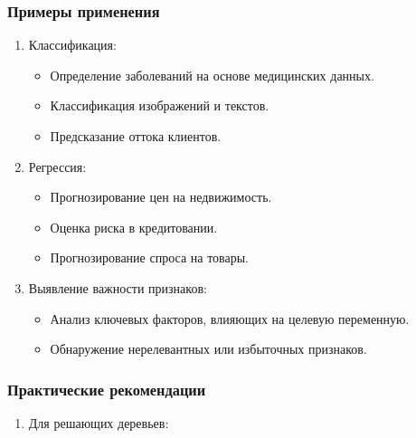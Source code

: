 \begin{enumerate}
{\subsubsection*{Примеры
применения}\label{ux43fux440ux438ux43cux435ux440ux44b-ux43fux440ux438ux43cux435ux43dux435ux43dux438ux44f-1}}

\begin{enumerate}
\def\labelenumi{\arabic{enumi}.}
\tightlist
\item
  Классификация:

  \begin{itemize}
  \tightlist
  \item
    Определение заболеваний на основе медицинских данных.
  \item
    Классификация изображений и текстов.
  \item
    Предсказание оттока клиентов.
  \end{itemize}
\item
  Регрессия:

  \begin{itemize}
  \tightlist
  \item
    Прогнозирование цен на недвижимость.
  \item
    Оценка риска в кредитовании.
  \item
    Прогнозирование спроса на товары.
  \end{itemize}
\item
  Выявление важности признаков:

  \begin{itemize}
  \tightlist
  \item
    Анализ ключевых факторов, влияющих на целевую переменную.
  \item
    Обнаружение нерелевантных или избыточных признаков.
  \end{itemize}
\end{enumerate}

\hypertarget{ux43fux440ux430ux43aux442ux438ux447ux435ux441ux43aux438ux435-ux440ux435ux43aux43eux43cux435ux43dux434ux430ux446ux438ux438}{%
\subsubsection*{Практические
рекомендации}\label{ux43fux440ux430ux43aux442ux438ux447ux435ux441ux43aux438ux435-ux440ux435ux43aux43eux43cux435ux43dux434ux430ux446ux438ux438}}

\begin{enumerate}
\def\labelenumi{\arabic{enumi}.}
\tightlist
\item
  Для решающих деревьев:


\end{enumerate}
\end{enumerate}
